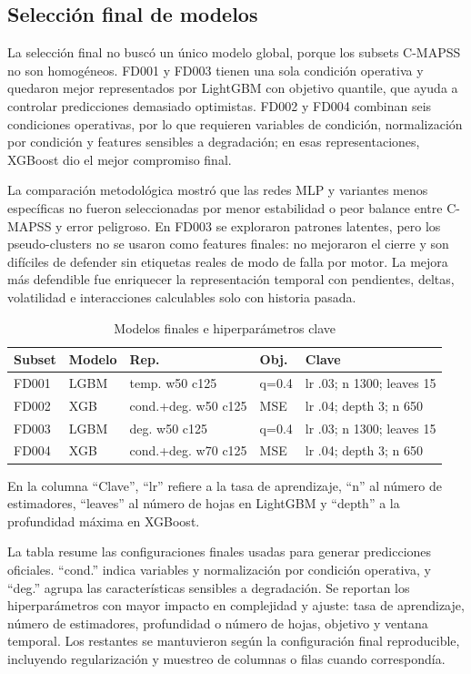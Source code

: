 \documentclass[conference, a4paper]{IEEEtran}
\begin{document}
\subsection{Selección final de modelos}
La selección final no buscó un único modelo global, porque los subsets C-MAPSS no son homogéneos. FD001 y FD003 tienen una sola condición operativa y quedaron mejor representados por LightGBM con objetivo quantile, que ayuda a controlar predicciones demasiado optimistas. FD002 y FD004 combinan seis condiciones operativas, por lo que requieren variables de condición, normalización por condición y features sensibles a degradación; en esas representaciones, XGBoost dio el mejor compromiso final.

La comparación metodológica mostró que las redes MLP y variantes menos específicas no fueron seleccionadas por menor estabilidad o peor balance entre C-MAPSS y error peligroso. En FD003 se exploraron patrones latentes, pero los pseudo-clusters no se usaron como features finales: no mejoraron el cierre y son difíciles de defender sin etiquetas reales de modo de falla por motor. La mejora más defendible fue enriquecer la representación temporal con pendientes, deltas, volatilidad e interacciones calculables solo con historia pasada.

\begin{table}[!htbp]
\caption{Modelos finales e hiperparámetros clave}
\label{tab:final_model_hyperparams}
\centering
\scriptsize
\begin{tabular}{lllll}
\hline
Subset & Modelo & Rep. & Obj. & Clave \\
\hline
FD001 & LGBM & temp. w50 c125 & q=0.4 & lr .03; n 1300; leaves 15 \\
FD002 & XGB & cond.+deg. w50 c125 & MSE & lr .04; depth 3; n 650 \\
FD003 & LGBM & deg. w50 c125 & q=0.4 & lr .03; n 1300; leaves 15 \\
FD004 & XGB & cond.+deg. w70 c125 & MSE & lr .04; depth 3; n 650 \\
\hline
\end{tabular}
\end{table}

En la columna ``Clave'', ``lr'' refiere a la tasa de aprendizaje, ``n'' al número de estimadores, ``leaves'' al número de hojas en LightGBM y ``depth'' a la profundidad máxima en XGBoost.

La tabla resume las configuraciones finales usadas para generar predicciones oficiales. ``cond.'' indica variables y normalización por condición operativa, y ``deg.'' agrupa las características sensibles a degradación. Se reportan los hiperparámetros con mayor impacto en complejidad y ajuste: tasa de aprendizaje, número de estimadores, profundidad o número de hojas, objetivo y ventana temporal. Los restantes se mantuvieron según la configuración final reproducible, incluyendo regularización y muestreo de columnas o filas cuando correspondía.
\end{document}

